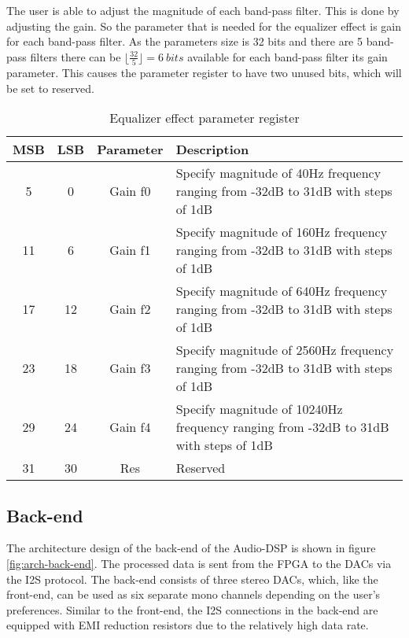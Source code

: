 The user is able to adjust the magnitude of each band-pass filter. This is done by adjusting the gain. So the parameter that is needed for the equalizer effect is gain for each band-pass filter. As the parameters size is 32 bits and there are 5 band-pass filters there can be $\lfloor\frac{32}{5}\rfloor=6\ bits$ available for each band-pass filter its gain parameter. This causes the parameter register to have two unused bits, which will be set to reserved.

\begin{table}[h!]
    \centering
    \begin{tabular}{|c|c|c|p{3.5in}|}
        \hline
        MSB & LSB & Parameter & Description\\
        \hline
        5 & 0 & Gain f0 & Specify magnitude of 40Hz frequency ranging from -32dB to 31dB with steps of 1dB\\
        \hline
        11 & 6 & Gain f1 & Specify magnitude of 160Hz frequency ranging from -32dB to 31dB with steps of 1dB\\
        \hline
        17 & 12 & Gain f2 & Specify magnitude of 640Hz frequency ranging from -32dB to 31dB with steps of 1dB\\
        \hline
        23 & 18 & Gain f3 & Specify magnitude of 2560Hz frequency ranging from -32dB to 31dB with steps of 1dB\\
        \hline
        29 & 24 & Gain f4 & Specify magnitude of 10240Hz frequency ranging from -32dB to 31dB with steps of 1dB\\
        \hline
        31 & 30 & Res & Reserved\\
        \hline
    \end{tabular}
    \caption{Equalizer effect parameter register}
    \label{table:eq-effect-parameters}
\end{table}

\subsection{Back-end}
The architecture design of the back-end of the Audio-DSP is shown in figure \ref{fig:arch-back-end}. The processed data is sent from the FPGA to the DACs via the I2S protocol. The back-end consists of three stereo DACs, which, like the front-end, can be used as six separate mono channels depending on the user's preferences. Similar to the front-end, the I2S connections in the back-end are equipped with EMI reduction resistors due to the relatively high data rate.

